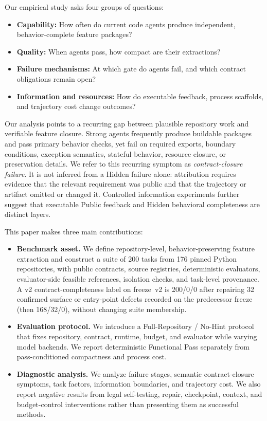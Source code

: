 \documentclass[acmsmall,anonymous,review,screen]{acmart}
\begin{document}
Our empirical study asks four groups of questions:
\begin{itemize}
  \item \textbf{Capability:} How often do current code agents produce
        independent, behavior-complete feature packages?
  \item \textbf{Quality:} When agents pass, how compact are their extractions?
  \item \textbf{Failure mechanisms:} At which gate do agents fail, and which
        contract obligations remain open?
  \item \textbf{Information and resources:} How do executable feedback,
        process scaffolds, and trajectory cost change outcomes?
\end{itemize}

Our analysis points to a recurring gap between plausible repository work and
verifiable feature closure. Strong agents frequently produce buildable packages
and pass primary behavior checks, yet fail on required exports, boundary
conditions, exception semantics, stateful behavior, resource closure, or
preservation details. We refer to this recurring symptom as
\emph{contract-closure failure}. It is not inferred from a Hidden failure alone:
attribution requires evidence that the relevant requirement was public and that
the trajectory or artifact omitted or changed it. Controlled information
experiments further suggest that executable Public feedback and Hidden
behavioral completeness are distinct layers.

This paper makes three main contributions:
\begin{itemize}
  \item \textbf{Benchmark asset.} We define repository-level,
        behavior-preserving feature extraction and construct a suite of 200
        tasks from 176 pinned Python repositories, with public contracts,
        source registries, deterministic evaluators, evaluator-side feasible
        references, isolation checks, and task-level provenance. A v2
        contract-completeness label on freeze~v2 is 200/0/0 after repairing
        32 confirmed surface or entry-point defects recorded on the
        predecessor freeze (then 168/32/0), without changing suite membership.
  \item \textbf{Evaluation protocol.} We introduce a Full-Repository / No-Hint
        protocol that fixes repository, contract, runtime, budget, and evaluator
        while varying model backends. We report deterministic Functional Pass
        separately from pass-conditioned compactness and process cost.
  \item \textbf{Diagnostic analysis.} We analyze failure stages, semantic
        contract-closure symptoms, task factors, information boundaries, and
        trajectory cost. We also report negative results from legal
        self-testing, repair, checkpoint, context, and budget-control
        interventions rather than presenting them as successful methods.
\end{itemize}
\end{document}
